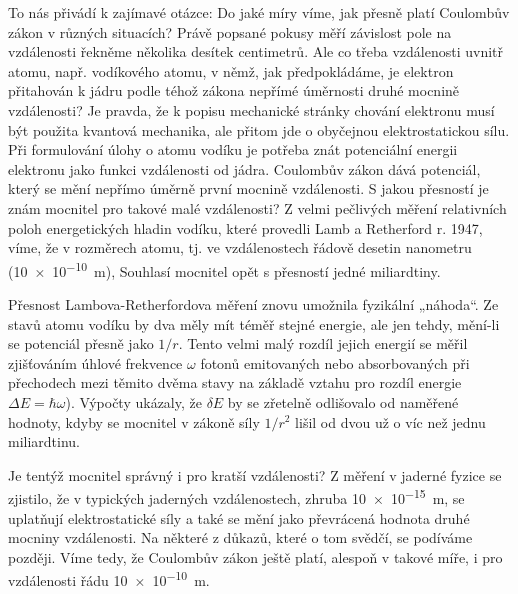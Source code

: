       To nás přivádí k zajímavé otázce: Do jaké míry víme, jak přesně platí Coulombův zákon v různých 
      situacích? Právě popsané pokusy měří závislost pole na vzdálenosti řekněme několika desítek centimetrů. 
      Ale co třeba vzdálenosti uvnitř atomu, např. vodíkového atomu, v němž, jak předpokládáme, je elektron 
      přitahován k jádru podle téhož zákona nepřímé úměrnosti druhé mocnině vzdálenosti? Je pravda, že k 
      popisu mechanické stránky chování elektronu musí být použita kvantová mechanika, ale přitom jde o 
      obyčejnou elektrostatickou sílu. Při formulování úlohy o atomu vodíku je potřeba znát potenciální 
      energii elektronu jako funkci vzdálenosti od jádra. Coulombův zákon dává potenciál, který se mění 
      nepřímo úměrně první mocnině vzdálenosti. S jakou přesností je znám mocnitel pro takové malé 
      vzdálenosti? Z velmi pečlivých měření relativních poloh energetických hladin vodíku, které provedli 
      Lamb a Retherford r. 1947, víme, že v rozměrech atomu, tj. ve vzdálenostech řádově desetin nanometru 
      (\SI{10e-10}{\meter}), Souhlasí mocnitel opět s přesností jedné miliardtiny.
      
      Přesnost Lambova-Retherfordova měření znovu umožnila fyzikální „náhoda“. Ze stavů atomu vodíku by dva 
      měly mít téměř stejné energie, ale jen tehdy, mění-li se potenciál přesně jako \(1/r\). Tento velmi 
      malý rozdíl jejich energií se měřil zjišťováním úhlové frekvence \(\omega\) fotonů emitovaných nebo 
      absorbovaných při přechodech mezi těmito dvěma stavy na základě vztahu pro rozdíl energie \(\Delta E 
      = \si{\planckbar}\omega\)). Výpočty ukázaly, že \(\delta E\) by se zřetelně odlišovalo od naměřené 
      hodnoty, kdyby se mocnitel v zákoně síly \(1/r^2\) lišil od dvou už o víc než jednu miliardtinu.
      
      Je tentýž mocnitel správný i pro kratší vzdálenosti? Z měření v jaderné fyzice se zjistilo, že v 
      typických jaderných vzdálenostech, zhruba \SI{10e-15}{\meter}, se uplatňují elektrostatické síly a také 
      se mění jako převrácená hodnota druhé mocniny vzdálenosti. Na některé z důkazů, které o tom svědčí, se 
      podíváme později. Víme tedy, že Coulombův zákon ještě platí, alespoň v takové míře, i pro vzdálenosti 
      řádu \SI{10e-10}{\meter}.
      
